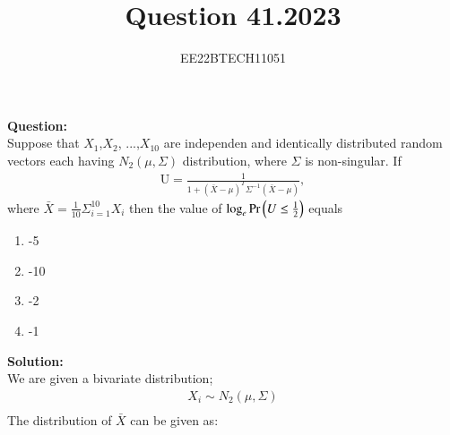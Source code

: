 \documentclass[journal,12pt,onecolumn]{IEEEtran}
\theoremstyle{remark}
\begin{document}

\vspace{3cm}


\title{Question 41.2023}
\author{EE22BTECH11051}

\maketitle
\vspace{3cm}

\textbf{Question:} \\
Suppose that $X_1$,$X_2$, ...,$X_{10}$ are independen and identically distributed random vectors each having
$N_2(\mu,\Sigma)$ distribution, where $\Sigma$ is non-singular. If
\begin{align}
    \text{U} = \frac{1}{1+(\bar{X} - \mu)^T\Sigma^{-1}(\bar{X} - \mu)} ,
\end{align}
where $\bar X = \frac{1}{10}\Sigma_{i = 1}^{10} X_{i}$ then the value of $\log_e \Pr\left(U \le \frac{1}{2}\right)$ equals

\begin{enumerate}
    \item -5
    \item -10
    \item -2
    \item -1
\end{enumerate}
\textbf{Solution:}\\
We are given a bivariate distribution;
\begin{align}
    X_{i} \sim N_2(\mu,\Sigma)\\
\end{align}
The distribution of $\bar{X}$ can be given as: \\
\end{document}
